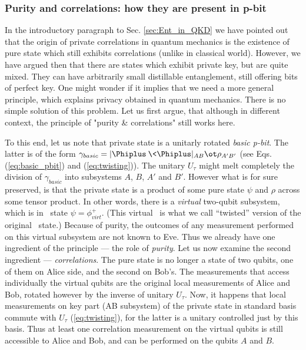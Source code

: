 \documentclass[rmp,12pt,preprint]{revtex4-2}
\begin{document}
\subsubsection{Purity and correlations: how they are present in p-bit}
In the introductory paragraph to Sec. \ref{sec:Ent_in_QKD} we
have pointed out that the origin of private correlations in quantum
mechanics is the existence of pure state which still exhibits
correlations (unlike in classical world). However, we have
argued then that there are states which exhibit private key, but are
quite mixed. They can have arbitrarily small distillable
entanglement, still offering bits of perfect key. One might wonder if it implies that
we need a more general principle, which explains privacy obtained in quantum mechanics.
There is no simple solution of this problem. Let us first argue,
that although in different context, the principle of "purity \& correlations" still
works here.

To this end, let us note that private state is a unitarly rotated {\it
basic p-bit}. The latter is of the form $\gamma_{basic}=|\Phiplus\>\<\Phiplus|_{AB}\ot
\rho_{A'B'}$ (see Eqs. (\ref{eq:basic_pbit}) and (\ref{eq:twisting})). The unitary $U_{\tau}$ might melt completely the division of $\gamma_{basic}$ into
subsystems $A$, $B$, $A'$ and $B'$. However what is for sure
preserved, is that the private state is a product of some pure state
$\psi$  and $\rho$ across some tensor product. In other words, there
is a \emph{virtual} two-qubit subsystem, which is in \wsinglet\ state
$\psi=\phi^+_{virt}$. (This virtual \wsinglet\ is what we call
``twisted'' version of the original \wsinglet\ state.)  Because of
purity, the outcomes of any measurement performed on this virtual subsystem
are not known to Eve. Thus we already have one ingredient of the
principle --- the role of {\it purity}. Let us now examine the second
ingredient --- {\it correlations}. The pure state is no longer a state of two qubits, one of them on Alice side, and the second on Bob's. The measurements that access individually the virtual qubits are the original local measurements of Alice and Bob, rotated however by the inverse of unitary $U_{\tau}$. Now, it happens that local measurements on key part (AB subsystem) of the private state in standard basis commute with $U_{\tau}$ (\ref{eq:twisting}), for the latter is a unitary controlled just by this basis. Thus at least one correlation measurement on the virtual
qubits is still accessible to Alice and Bob, and can be performed on
the qubits $A$ and $B$.
\end{document}
